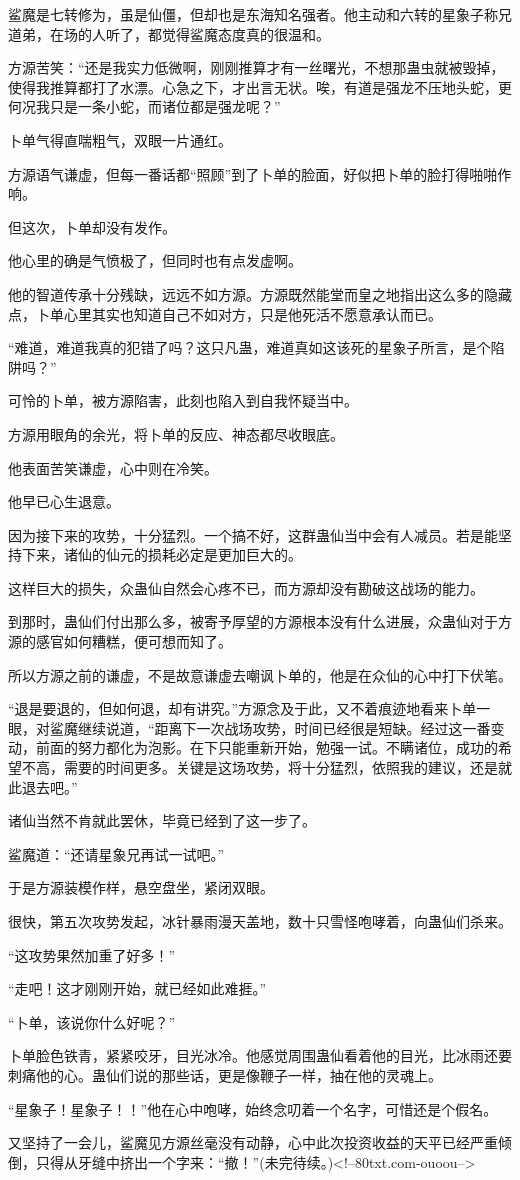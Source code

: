 \begin{this_body}
鲨魔是七转修为，虽是仙僵，但却也是东海知名强者。他主动和六转的星象子称兄道弟，在场的人听了，都觉得鲨魔态度真的很温和。

方源苦笑：“还是我实力低微啊，刚刚推算才有一丝曙光，不想那蛊虫就被毁掉，使得我推算都打了水漂。心急之下，才出言无状。唉，有道是强龙不压地头蛇，更何况我只是一条小蛇，而诸位都是强龙呢？”

卜单气得直喘粗气，双眼一片通红。

方源语气谦虚，但每一番话都“照顾”到了卜单的脸面，好似把卜单的脸打得啪啪作响。

但这次，卜单却没有发作。

他心里的确是气愤极了，但同时也有点发虚啊。

他的智道传承十分残缺，远远不如方源。方源既然能堂而皇之地指出这么多的隐藏点，卜单心里其实也知道自己不如对方，只是他死活不愿意承认而已。

“难道，难道我真的犯错了吗？这只凡蛊，难道真如这该死的星象子所言，是个陷阱吗？”

可怜的卜单，被方源陷害，此刻也陷入到自我怀疑当中。

方源用眼角的余光，将卜单的反应、神态都尽收眼底。

他表面苦笑谦虚，心中则在冷笑。

他早已心生退意。

因为接下来的攻势，十分猛烈。一个搞不好，这群蛊仙当中会有人减员。若是能坚持下来，诸仙的仙元的损耗必定是更加巨大的。

这样巨大的损失，众蛊仙自然会心疼不已，而方源却没有勘破这战场的能力。

到那时，蛊仙们付出那么多，被寄予厚望的方源根本没有什么进展，众蛊仙对于方源的感官如何糟糕，便可想而知了。

所以方源之前的谦虚，不是故意谦虚去嘲讽卜单的，他是在众仙的心中打下伏笔。

“退是要退的，但如何退，却有讲究。”方源念及于此，又不着痕迹地看来卜单一眼，对鲨魔继续说道，“距离下一次战场攻势，时间已经很是短缺。经过这一番变动，前面的努力都化为泡影。在下只能重新开始，勉强一试。不瞒诸位，成功的希望不高，需要的时间更多。关键是这场攻势，将十分猛烈，依照我的建议，还是就此退去吧。”

诸仙当然不肯就此罢休，毕竟已经到了这一步了。

鲨魔道：“还请星象兄再试一试吧。”

于是方源装模作样，悬空盘坐，紧闭双眼。

很快，第五次攻势发起，冰针暴雨漫天盖地，数十只雪怪咆哮着，向蛊仙们杀来。

“这攻势果然加重了好多！”

“走吧！这才刚刚开始，就已经如此难捱。”

“卜单，该说你什么好呢？”

卜单脸色铁青，紧紧咬牙，目光冰冷。他感觉周围蛊仙看着他的目光，比冰雨还要刺痛他的心。蛊仙们说的那些话，更是像鞭子一样，抽在他的灵魂上。

“星象子！星象子！！”他在心中咆哮，始终念叨着一个名字，可惜还是个假名。

又坚持了一会儿，鲨魔见方源丝毫没有动静，心中此次投资收益的天平已经严重倾倒，只得从牙缝中挤出一个字来：“撤！”(未完待续。)<!--80txt.com-ouoou-->

\end{this_body}

